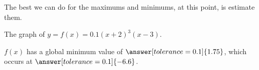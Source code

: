 \documentclass{ximera}
\begin{document}
The best we can do for the maximums and minimums, at this point, is estimate them.







\begin{example}

The graph of $y = f(x) = 0.1(x+2)^3(x-3)$.



\begin{center}
\end{center}

\end{example}


$f(x)$ has a global minimum value of $\answer[tolerance=0.1]{1.75}$, which occurs at $\answer[tolerance=0.1]{-6.6}$.
\end{document}
